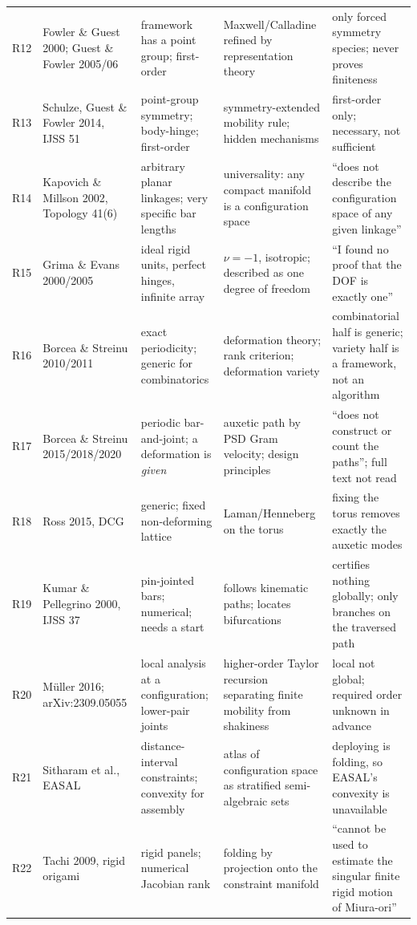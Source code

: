 \documentclass[10pt,a4paper]{article}
\begin{document}
\begin{longtable}{@{}p{6mm}p{34mm}p{40mm}p{38mm}p{42mm}@{}}
R12 & Fowler \& Guest 2000; Guest \& Fowler 2005/06 & framework has a point group; first-order & Maxwell/Calladine refined by representation theory & only forced symmetry species; never proves finiteness \\
R13 & Schulze, Guest \& Fowler 2014, IJSS 51 & point-group symmetry; body-hinge; first-order & symmetry-extended mobility rule; hidden mechanisms & first-order only; necessary, not sufficient \\
R14 & Kapovich \& Millson 2002, Topology 41(6) & arbitrary planar linkages; very specific bar lengths & universality: any compact manifold is a configuration space & ``does not describe the configuration space of any given linkage'' \\
R15 & Grima \& Evans 2000/2005 & ideal rigid units, perfect hinges, infinite array & $\nu=-1$, isotropic; described as one degree of freedom & ``I found no proof that the DOF is exactly one'' \\
R16 & Borcea \& Streinu 2010/2011 & exact periodicity; generic for combinatorics & deformation theory; rank criterion; deformation variety & combinatorial half is generic; variety half is a framework, not an algorithm \\
R17 & Borcea \& Streinu 2015/2018/2020 & periodic bar-and-joint; a deformation is \emph{given} & auxetic path by PSD Gram velocity; design principles & ``does not construct or count the paths''; full text not read \\
R18 & Ross 2015, DCG & generic; fixed non-deforming lattice & Laman/Henneberg on the torus & fixing the torus removes exactly the auxetic modes \\
R19 & Kumar \& Pellegrino 2000, IJSS 37 & pin-jointed bars; numerical; needs a start & follows kinematic paths; locates bifurcations & certifies nothing globally; only branches on the traversed path \\
R20 & M\"uller 2016; arXiv:2309.05055 & local analysis at a configuration; lower-pair joints & higher-order Taylor recursion separating finite mobility from shakiness & local not global; required order unknown in advance \\
R21 & Sitharam et al., EASAL & distance-interval constraints; convexity for assembly & atlas of configuration space as stratified semi-algebraic sets & deploying is folding, so EASAL's convexity is unavailable \\
R22 & Tachi 2009, rigid origami & rigid panels; numerical Jacobian rank & folding by projection onto the constraint manifold & ``cannot be used to estimate the singular finite rigid motion of Miura-ori'' \\

\end{longtable}
\end{document}
